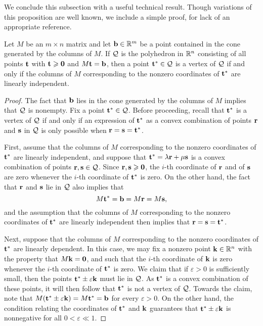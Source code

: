 \documentclass[11pt]{amsart}
\begin{document}
We conclude this subsection with a useful technical result.
Though variations of this proposition are well known, we include a simple proof, for lack of an appropriate reference.

\begin{proposition}  
\label{vertex: P}
Let $M$ be an $m \times n$ matrix and let $\mathbf{b} \in \mathbb{R}^m$ be a point contained in the cone generated by the columns of $M$.  If $\mathcal{Q}$ is the polyhedron in $\mathbb{R}^n$  consisting of all points $\mathbf{t}$ with $\mathbf{t} \geqslant \mathbf{0}$ and $M \mathbf{t} = \mathbf{b}$, then a point $\mathbf{t}^{\ast} \in \mathcal{Q}$ is a vertex of $\mathcal{Q}$ if and only if the columns of $M$ corresponding to the nonzero coordinates of $\mathbf{t}^{\ast}$ are linearly independent.  %
\end{proposition}

\begin{proof}
   The fact that $\mathbf{b}$ lies in the cone generated by the columns of $M$ implies that $\mathcal{Q}$ is nonempty.
   Fix a point $\mathbf{t}^{\ast} \in \mathcal{Q}$.
   Before proceeding, recall that $\mathbf{t}^{\ast}$ is a vertex of $\mathcal{Q}$ if and only if an expression of $\mathbf{t}^{\ast}$ as a convex combination of points $\mathbf{r}$ and $\mathbf{s}$ in $\mathcal{Q}$ is only possible when $\mathbf{r}=\mathbf{s}=\mathbf{t}^{\ast}$.

   First, assume that the columns of $M$ corresponding to the nonzero coordinates of $\mathbf{t}^{\ast}$ are linearly independent, and suppose that $\mathbf{t}^{\ast} = \lambda \mathbf{r} + \mu \mathbf{s}$ is a convex combination of points $\mathbf{r}, \mathbf{s} \in \mathcal{Q}$.
   Since $\mathbf{r},\mathbf{s}\geqslant \mathbf{0}$, the $i$-th coordinate of $\mathbf{r}$ and of $\mathbf{s}$ are zero whenever the $i$-th coordinate of $\mathbf{t}^{\ast}$ is zero.
   On the other hand, the fact that $\mathbf{r}$ and $\mathbf{s}$ lie in $\mathcal{Q}$ also implies that
   \[ M \mathbf{t}^{\ast} = \mathbf{b} = M \mathbf{r} = M \mathbf{s}, \]
   and the assumption that the columns of $M$ corresponding to the nonzero coordinates of $\mathbf{t}^{\ast}$ are linearly independent then implies that $\mathbf{r}=\mathbf{s}=\mathbf{t}^{\ast}$.

Next, suppose that the columns of $M$ corresponding to the nonzero coordinates of $\mathbf{t}^{\ast}$ are linearly dependent.   In this case, we may fix a nonzero point $\mathbf{k} \in \mathbb{R}^n$ with the property that $M \mathbf{k} = \mathbf{0}$, and such that the $i$-th coordinate of $\mathbf{k}$ is zero whenever the $i$-th coordinate of $\mathbf{t}^{\ast}$ is zero.  We claim that if $\varepsilon > 0$ is sufficiently small, then the points $\mathbf{t}^{\ast} \pm \varepsilon \mathbf{k}$ must lie in $\mathcal{Q}$.   As $\mathbf{t}^{\ast}$ is a convex combination of these points, it will then follow that $\mathbf{t}^{\ast}$ is not a vertex of $\mathcal{Q}$.  Towards the claim, note that $M(\mathbf{t}^{\ast} \pm \varepsilon \mathbf{k}) = M \mathbf{t}^{\ast} = \mathbf{b}$ for every $\varepsilon > 0$.  On the other hand, the condition relating the coordinates of $\mathbf{t}^{\ast}$ and $\mathbf{k}$ guarantees that $\mathbf{t}^{\ast} \pm \varepsilon \mathbf{k}$ is nonnegative for all $0 < \varepsilon \ll 1$.  
\end{proof}
\end{document}
